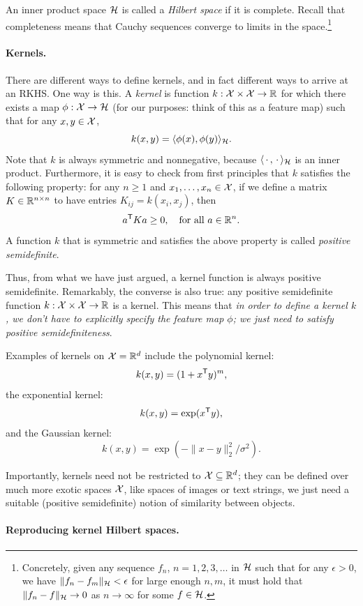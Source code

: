 \documentclass{article}
\begin{document}
An inner product space $\mathcal{H}$ is called a \emph{Hilbert space} if it is
complete. Recall that completeness means that Cauchy sequences converge to   
limits in the space.\footnote{Concretely, given any sequence $f_n$,
  $n=1,2,3,\dots$ in $\mathcal{H}$ such that for any $\epsilon>0$, we have $\|f_n - 
  f_m\|_{\mathcal{H}} < \epsilon$ for large enough $n,m$, it must hold that $\|f_n - 
  f\|_{\mathcal{H}} \to 0$ as $n \to \infty$ for some $f \in \mathcal{H}$.}

\paragraph{Kernels.}

There are different ways to define kernels, and in fact different ways to arrive 
at an RKHS. One way is this. A \emph{kernel} is function $k : \mathcal{X} \times \mathcal{X} \to 
\mathbb{R}$ for which there exists a map $\phi : \mathcal{X} \to \mathcal{H}$ (for our purposes: think
of this as a feature map) such that for any $x,y \in \mathcal{X}$,  
\[
k(x,y) = \langle \phi(x), \phi(y) \rangle_{\mathcal{H}}.
\]
Note that $k$ is always symmetric and nonnegative, because $\langle \,\cdot\,, 
\,\cdot\, \rangle_{\mathcal{H}}$ is an inner product. Furthermore, it is easy to check
from first principles that $k$ satisfies the following property: for any $n \geq
1$ and $x_1,\dots,x_n \in \mathcal{X}$, if we define a matrix $K \in \mathbb{R}^{n \times n}$ to 
have entries $K_{ij} = k(x_i, x_j)$, then  
\[
a^{\mathsf{T}} K a \geq 0, \quad \text{for all $a \in \mathbb{R}^n$}.
\]
A function $k$ that is symmetric and satisfies the above property is called 
\emph{positive semidefinite}. 

Thus, from what we have just argued, a kernel function is always positive
semidefinite. Remarkably, the converse is also true: any positive semidefinite
function $k : \mathcal{X} \times \mathcal{X} \to \mathbb{R}$ is a kernel. This means that \emph{in order
  to define a kernel $k$, we don't have to explicitly specify the feature map 
  $\phi$; we just need to satisfy positive semidefiniteness}.  

Examples of kernels on $\mathcal{X} = \mathbb{R}^d$ include the polynomial kernel:   
\[
k(x,y) = (1 + x^{\mathsf{T}} y)^m,
\]
the exponential kernel:
\[
k(x,y) = \exp(x^{\mathsf{T}} y),
\]
and the Gaussian kernel: 
\[
k(x,y) = \exp(-\|x-y\|_2^2 / \sigma^2).
\]

Importantly, kernels need not be restricted to $\mathcal{X} \subseteq \mathbb{R}^d$; they can be
defined over much more exotic spaces $\mathcal{X}$, like spaces of images or text
strings, we just need a suitable (positive semidefinite) notion of similarity
between objects.   

\paragraph{Reproducing kernel Hilbert spaces.} 
\end{document}
